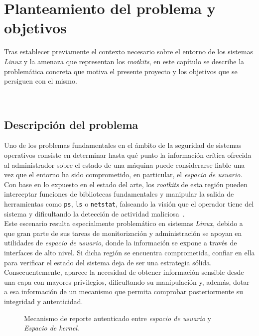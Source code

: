 \chapter{Planteamiento del problema y objetivos}
\label{cap:capitulo4}

Tras establecer previamente el contexto necesario sobre el entorno de los sistemas \textit{Linux} y la amenaza que representan los \textit{rootkits}, en este capítulo se describe la problemática concreta que motiva el presente proyecto y los objetivos que se persiguen con el mismo.

\

\section{Descripción del problema}

Uno de los problemas fundamentales en el ámbito de la seguridad de sistemas operativos consiste en determinar hasta qué punto la información crítica ofrecida al administrador sobre el estado de una máquina puede considerarse fiable una vez que el entorno ha sido comprometido, en particular, el \textit{espacio de usuario}.
Con base en lo expuesto en el estado del arte, los \textit{rootkits} de esta región pueden interceptar funciones de bibliotecas fundamentales y manipular la salida de herramientas como \texttt{ps}, \texttt{ls} o \texttt{netstat}, falseando la visión que el operador tiene del sistema y dificultando la detección de actividad maliciosa~\cite{rootkits}.\\

Este escenario resulta especialmente problemático en sistemas \textit{Linux}, debido a que gran parte de sus tareas de monitorización y administración se apoyan en utilidades de \textit{espacio de usuario}, donde la información se expone a través de interfaces de alto nivel.
Si dicha región se encuentra comprometida, confiar en ella para verificar el estado del sistema deja de ser una estrategia sólida.
Consecuentemente, aparece la necesidad de obtener información sensible desde una capa con mayores privilegios, dificultando su manipulación y, además, dotar a esa información de un mecanismo que permita comprobar posteriormente su integridad y autenticidad.\\

\begin{figure}[h!]
  \centering
  \scalebox{0.9}{}
  \caption{Mecanismo de reporte autenticado entre \textit{espacio de usuario} y \textit{Espacio de kernel}.}
  \label{fig:secure_reporting_scheme}
\end{figure}


